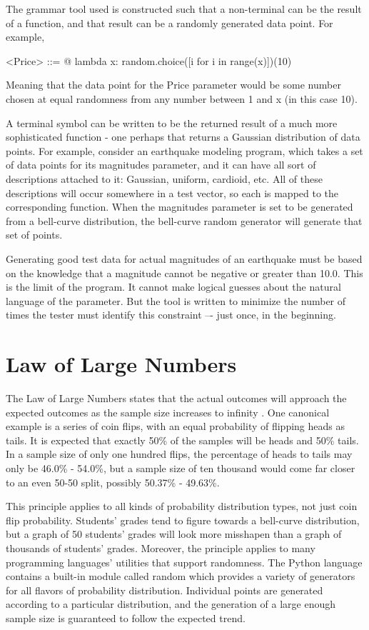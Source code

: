 The grammar tool used is constructed such that a non-terminal can be the result of a function, and that result can be a randomly generated data point. For example,

\begin{grammar}
<Price> ::= @ lambda x: random.choice([i for i in range(x)])(10)
\end{grammar}

Meaning that the data point for the Price parameter would be some number chosen at equal randomness from any number between 1 and x (in this case 10).

A terminal symbol can be written to be the returned result of a much more sophisticated function - one perhaps that returns a Gaussian distribution of data points. For example, consider an earthquake modeling program, which takes a set of data points for its magnitudes parameter, and it can have all sort of descriptions attached to it: Gaussian, uniform, cardioid, etc. All of these descriptions will occur somewhere in a test vector, so each is mapped to the corresponding function. When the magnitudes parameter is set to be generated from a bell-curve distribution, the bell-curve random generator will generate that set of points.

Generating good test data for actual magnitudes of an earthquake must be based on the knowledge that a magnitude cannot be negative or greater than 10.0. This is the limit of the program. It cannot make logical guesses about the natural language of the parameter. But the tool is written to minimize the number of times the tester must identify this constraint –- just once, in the beginning.

\section{Law of Large Numbers}
The Law of Large Numbers states that the actual outcomes will approach the expected outcomes as the sample size increases to infinity . One canonical example is a series of coin flips, with an equal probability of flipping heads as tails. It is expected that exactly 50\% of the samples will be heads and 50\% tails. In a sample size of only one hundred flips, the percentage of heads to tails may only be 46.0\% - 54.0\%, but a sample size of ten thousand would come far closer to an even 50-50 split, possibly 50.37\% - 49.63\%. 

This principle applies to all kinds of probability distribution types, not just coin flip probability. Students’ grades tend to figure towards a bell-curve distribution, but a graph of 50 students’ grades will look more misshapen than a graph of thousands of students’ grades. Moreover, the principle applies to many programming languages’ utilities that support randomness. The Python language contains a built-in module called random which provides a variety of generators for all flavors of probability distribution. Individual points are generated according to a particular distribution, and the generation of a large enough sample size is guaranteed to follow the expected trend.

